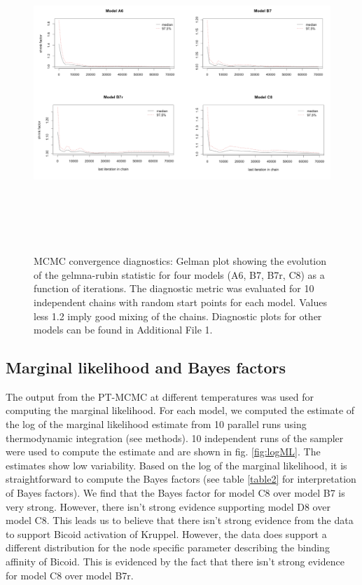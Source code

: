 \begin{figure}[h!]
\includegraphics[height = 12cm, width = 13.5cm]{tex/embryo/figure-3.png}
  \caption{MCMC convergence diagnostics: Gelman plot showing the evolution of the gelmna-rubin statistic for four models (A6, B7, B7r, C8) as a function of iterations. The diagnostic metric was evaluated for 10 independent chains with random start points for each model. Values less 1.2 imply good mixing of the chains. Diagnostic plots for other models can be found in Additional File 1.}
\label{fig:figure-3}
\end{figure}




\subsection{Marginal likelihood and Bayes factors}

The output from the PT-MCMC at different temperatures was used for computing the marginal likelihood. For each model, we computed the estimate of the log of the marginal likelihood estimate from 10 parallel runs using thermodynamic integration (see methods). 10 independent runs of the sampler were used to compute the estimate and are shown in fig. \ref{fig:logML}. The estimates show low variability. Based on the log of the marginal likelihood, it is straightforward to compute the Bayes factors (see table \ref{table2} for interpretation of Bayes factors). We find that the Bayes factor for model C8 over model B7 is very strong. However, there isn't strong evidence supporting model D8 over model C8. This leads us to believe that there isn't strong evidence from the data to support Bicoid activation of Kruppel. However, the data does support a different distribution for the node specific parameter describing the binding affinity of Bicoid. This is evidenced by the fact that there isn't strong evidence for model C8 over model B7r. 

